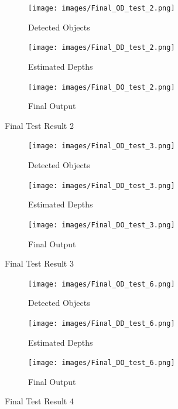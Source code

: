 \documentclass[a4paper, openany]{book}
\begin{document}
\newpage

\begin{figure}[ht]
  \centering
    \begin{subfigure}[b]{0.45\linewidth}
    \texttt{[image: images/Final\_OD\_test\_2.png]}
    \caption{Detected Objects}
  \end{subfigure}
  \begin{subfigure}[b]{0.45\linewidth}
    \texttt{[image: images/Final\_DD\_test\_2.png]}
    \caption{Estimated Depths}
  \end{subfigure}
      \begin{subfigure}[b]{0.9\linewidth}
    \texttt{[image: images/Final\_DO\_test\_2.png]}
    \caption{Final Output}
  \end{subfigure}
  
      \caption{Final Test Result 2}
  \label{fig:DO_t_images2}
\end{figure}

\newpage


\begin{figure}[ht]
  \centering
    \begin{subfigure}[b]{0.45\linewidth}
    \texttt{[image: images/Final\_OD\_test\_3.png]}
    \caption{Detected Objects}
  \end{subfigure}
  \begin{subfigure}[b]{0.45\linewidth}
    \texttt{[image: images/Final\_DD\_test\_3.png]}
    \caption{Estimated Depths}
  \end{subfigure}
      \begin{subfigure}[b]{0.9\linewidth}
    \texttt{[image: images/Final\_DO\_test\_3.png]}
    \caption{Final Output}
  \end{subfigure}
  
      \caption{Final Test Result 3}
  \label{fig:DO_t_images3}
\end{figure}


\newpage


\begin{figure}[ht]
  \centering
    \begin{subfigure}[b]{0.45\linewidth}
    \texttt{[image: images/Final\_OD\_test\_6.png]}
    \caption{Detected Objects}
  \end{subfigure}
  \begin{subfigure}[b]{0.45\linewidth}
    \texttt{[image: images/Final\_DD\_test\_6.png]}
    \caption{Estimated Depths}
  \end{subfigure}
      \begin{subfigure}[b]{0.9\linewidth}
    \texttt{[image: images/Final\_DO\_test\_6.png]}
    \caption{Final Output}
  \end{subfigure}
  
      \caption{Final Test Result 4}
  \label{fig:DO_t_images4}
\end{figure}
\end{document}
